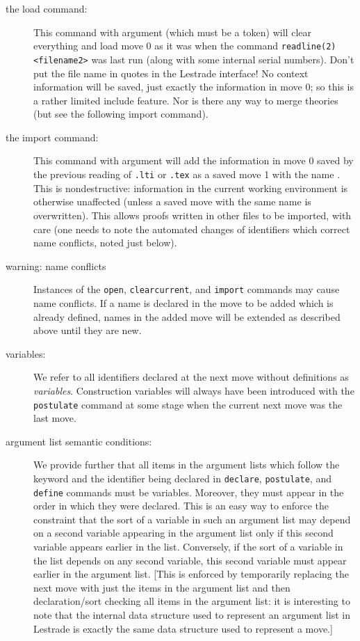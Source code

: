 \documentclass[12pt]{article}
\begin{document}
\begin{description}
\item[the load command:]   This command with argument {\tt <filename1>} (which must be a token) will clear everything and load move 0 as it was when the command
{\tt readline(2)} {\tt <filename1> <filename2>} was last run (along with some internal serial numbers).  Don't put the file name in quotes in the Lestrade interface!  No context information will be saved, just exactly the information in move 0; so this is a rather limited include feature.  Nor is there any way to merge theories (but see the following import command).

\item[the import command:]  This command with argument {\tt <filename1>} will add the information in move 0 saved by the previous reading of {\tt <filename1>.lti} or {\tt <filename1>.tex} as a saved move 1 with the name {\tt <filename1>}.  This is nondestructive:  information in the current working environment is otherwise unaffected (unless a saved move with the same name is overwritten).  This allows proofs written in other files to be imported, with care (one needs to note the automated changes of identifiers which correct name conflicts, noted just below).

\item[warning:  name conflicts]  Instances of the {\tt open}, {\tt clearcurrent}, and {\tt import} commands may cause name conflicts.  If a name is declared in the move to be added which is already defined, names in the added move will be extended as described above until they are new.

\item[variables:]  We refer to all identifiers declared at the next move without definitions as {\em variables\/}.  Construction variables will always have been introduced with the {\tt postulate} command at some stage when the current next move was the last move.

\item[argument list semantic conditions:]  We provide further that all items in the argument lists which follow the keyword and the identifier being declared in {\tt declare}, {\tt postulate}, and {\tt define} commands
must be variables.  Moreover, they must appear in the order in which they were declared.  This is an easy way to enforce the constraint that the sort of a variable in such an
argument list may depend on a second variable appearing in the argument list only if this second variable appears earlier in the list.   Conversely, if the sort of a variable in the list depends
on any second variable, this second variable must appear earlier in the argument list.  [This is enforced by temporarily replacing the next move with just the items in the argument list and then declaration/sort checking all items in the argument list:  it is interesting to note that the internal data structure used to represent an argument list in Lestrade is exactly the same data structure used to represent a move.]


\end{description}
\end{document}
